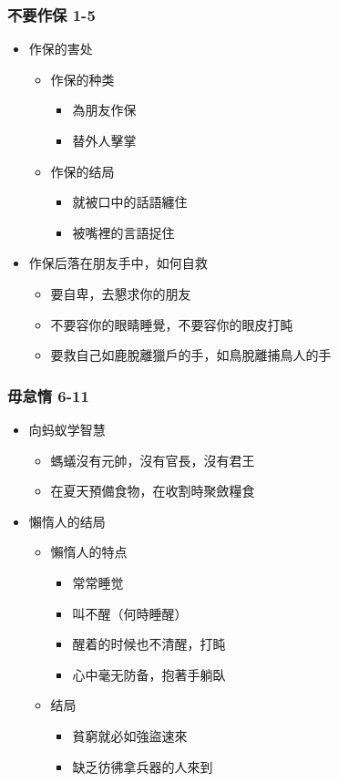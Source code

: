 \subsubsection{不要作保 1-5}
\begin{itemize}
\itemsep-.45em  
\item 作保的害处
\begin{itemize}
\itemsep-.45em  
\item 作保的种类
\begin{itemize}
\itemsep-.45em  
\item 為朋友作保
\item 替外人擊掌
\end{itemize}
\item 作保的结局
\begin{itemize}
\itemsep-.45em  
\item 就被口中的話語纏住
\item 被嘴裡的言語捉住
\end{itemize}
\end{itemize}
\item 作保后落在朋友手中，如何自救
\begin{itemize}
\itemsep-.45em  
\item 要自卑，去懇求你的朋友
\item 不要容你的眼睛睡覺，不要容你的眼皮打盹
\item 要救自己如鹿脫離獵戶的手，如鳥脫離捕鳥人的手
\end{itemize}
\end{itemize}



\subsubsection{毋怠惰 6-11}
\begin{itemize}
\itemsep-.45em  
\item 向蚂蚁学智慧
\begin{itemize}
\itemsep-.45em  
\item 螞蟻沒有元帥，沒有官長，沒有君王
\item 在夏天預備食物，在收割時聚斂糧食
\end{itemize}
\item 懶惰人的结局
\begin{itemize}
\itemsep-.45em  
\item 懶惰人的特点
\begin{itemize}
\itemsep-.45em  
\item 常常睡觉
\item 叫不醒（何時睡醒）
\item 醒着的时候也不清醒，打盹
\item 心中毫无防备，抱著手躺臥
\end{itemize}
\item 结局
\begin{itemize}
\itemsep-.45em  
\item 貧窮就必如強盜速來
\item 缺乏彷彿拿兵器的人來到
\end{itemize}
\end{itemize}
\end{itemize}

